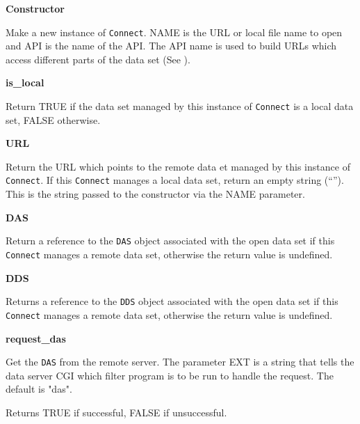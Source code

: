 \begin{description}

\item {\bf Constructor}


Make a new instance of {\tt Connect}. NAME is the URL or local file name to
open and API is the name of the API. The API name is used to build URLs which
access different parts of the data set (See \DDD).

\item {\bf is\_local}


Return TRUE if the data set managed by this instance of {\tt Connect} is a
local data set, FALSE otherwise.

\item {\bf URL}


Return the URL which points to the remote data et managed by this instance of
{\tt Connect}. If this {\tt Connect} manages a local data set, return an
empty string (``''). This is the string passed to the constructor via the
NAME parameter.

\item {\bf DAS}


Return a reference to the {\tt DAS} object associated with the open data set
if this {\tt Connect} manages a remote data set, otherwise the return value
is undefined.

\item {\bf DDS}


Returns a reference to the {\tt DDS} object associated with the open data set
if this {\tt Connect} manages a remote data set, otherwise the return value
is undefined.

\item {\bf request\_das}


Get the {\tt DAS} from the remote server.  The parameter EXT is a string that
tells the data server CGI which filter program is to be run to handle the
request.  The default is "das".

Returns TRUE if successful, FALSE if unsuccessful.


\end{description}
